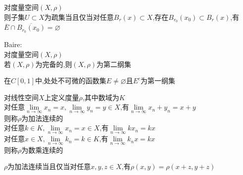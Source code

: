 \begin{dingli}
对度量空间$(X,\rho)$\\
则子集$U\subset X$为疏集当且仅当对任意$B_{r}(x)\subset X$,存在$B_{r_0}(x_0)\subset B_{r}(x)$,有$\overline{E}\cap\overline{B_{r_0}(x_0)}=\varnothing$
\end{dingli}

\begin{dingli}
Baire:\\
对度量空间$(X,\rho)$\\
若$(X,\rho)$为完备的,则$(X,\rho)$为第二纲集
\end{dingli}

\begin{zhu}
在$C[0,1]$中,处处不可微的函数集$E\neq\varnothing$且$E^{c}$为第一纲集
\end{zhu}

\begin{dingyi}
对线性空间$X$上定义度量$\rho$,其中数域为$K$\\
对任意$\lim\limits_{n\to\infty}x_n=x,\lim\limits_{n\to\infty}y_n=y\in X$,有$\lim\limits_{n\to\infty}x_n+y_n=x+y$\\
则称$\rho$为加法连续的\\
对任意$k\in K,\lim\limits_{n\to\infty}x_n=x\in X$,有$\lim\limits_{n\to\infty}kx_n=kx$\\
对任意$x\in X,\lim\limits_{n\to\infty}k_n=k\in K$,有$\lim\limits_{n\to\infty}k_nx=kx$\\
则称$\rho$为数乘连续的
\end{dingyi}

\begin{zhu}
$\rho$为加法连续当且仅当对任意$x,y,z\in X$,有$\rho(x,y)=\rho(x+z,y+z)$
\end{zhu}

